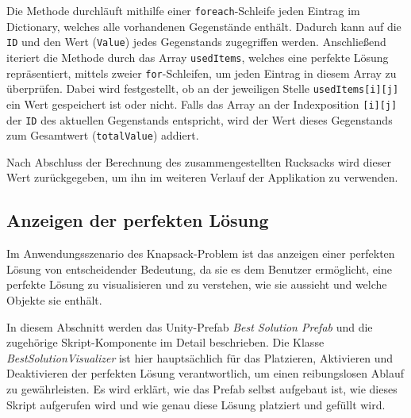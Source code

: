 Die Methode durchläuft mithilfe einer \texttt{foreach}-Schleife jeden Eintrag im Dictionary, welches alle vorhandenen
Gegenstände enthält. Dadurch kann auf die \texttt{ID} und den Wert (\texttt{Value}) jedes Gegenstands zugegriffen werden.
Anschließend iteriert die Methode durch das Array \texttt{usedItems}, welches eine perfekte Lösung repräsentiert, mittels
zweier \texttt{for}-Schleifen, um jeden Eintrag in diesem Array zu überprüfen. Dabei wird festgestellt, ob an der jeweiligen
Stelle \texttt{usedItems[i][j]} ein Wert gespeichert ist oder nicht. Falls das Array an der Indexposition \texttt{[i][j]}
der \texttt{ID} des aktuellen Gegenstands entspricht, wird der Wert dieses Gegenstands zum Gesamtwert (\texttt{totalValue})
addiert.

Nach Abschluss der Berechnung des zusammengestellten Rucksacks wird dieser Wert zurückgegeben, um ihn im weiteren Verlauf
der Applikation zu verwenden.

\subsection{Anzeigen der perfekten Lösung}
Im Anwendungsszenario des Knapsack-Problem ist das anzeigen einer perfekten Lösung von entscheidender Bedeutung, da sie
es dem Benutzer ermöglicht, eine perfekte Lösung zu visualisieren und zu verstehen, wie sie aussieht und welche Objekte sie enthält.

In diesem Abschnitt werden das Unity-Prefab \textit{Best Solution Prefab} und die zugehörige Skript-Komponente im Detail
beschrieben. Die Klasse \textit{BestSolutionVisualizer} ist hier hauptsächlich für das Platzieren, Aktivieren und Deaktivieren
der perfekten Lösung verantwortlich, um einen reibungslosen Ablauf zu gewährleisten. Es wird erklärt, wie das Prefab selbst
aufgebaut ist, wie dieses Skript aufgerufen wird und wie genau diese Lösung platziert und gefüllt wird.

